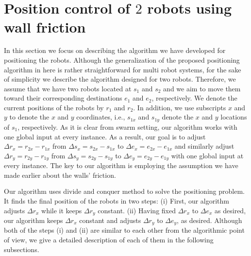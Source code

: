 \section{Position control of $2$ robots using wall friction}
In this section we focus on describing the algorithm we have developed for positioning the robots. Although the generalization of the proposed positioning algorithm in here is rather straightforward for multi robot systems, for the sake of simplicity we describe the algorithm designed for two robots. Therefore, we assume that we have two robots located at $s_1$ and $s_2$ and we aim to move them toward their corresponding destinations $e_1$ and $e_2$, respectively. We denote the current positions of the robots by $r_1$ and $r_2$. In addition, we use subscripts $x$ and $y$ to denote the $x$ and $y$ coordinates, i.e., $s_{1x}$ and $s_{1y}$ denote the $x$ and $y$ locations of $s_1$, respectively. As it is clear from swarm setting, our algorithm works with one global input at every instance. As a result, our goal is to adjust $\Delta r_x = r_{2x}-r_{1x}$ from $\Delta s_x = s_{2x}-s_{1x}$ to $\Delta e_x = e_{2x}-e_{1x}$ and similarly adjust $\Delta r_y = r_{2y}-r_{1y}$ from $\Delta s_y = s_{2y}-s_{1y}$ to $\Delta e_y = e_{2y}-e_{1y}$ with one global input at every instance. The key to our algorithm is employing the assumption we have made earlier about the walls' friction. 

Our algorithm uses divide and conquer method to solve the positioning problem. It finds the final position of the robots in two steps: (i) First, our algorithm adjusts $\Delta r_x$ while it keeps $\Delta r_y$ constant. (ii) Having fixed $\Delta r_x$ to $\Delta e_x$ as desired, our algorithm keeps $\Delta r_x$ constant and adjusts $\Delta r_y$ to $\Delta e_y$, as desired. Although both of the steps (i) and (ii) are similar to each other from the algorithmic point of view, we give a detailed description of each of them in the following subsections.


